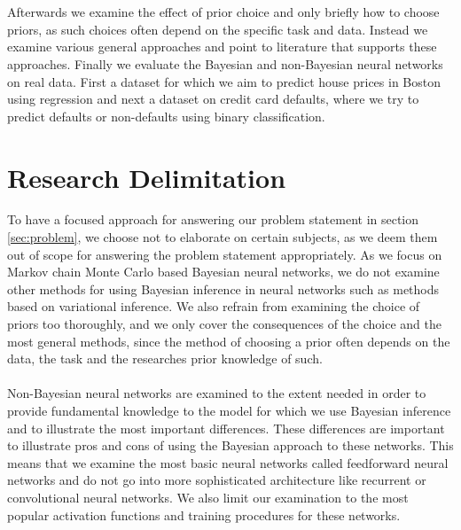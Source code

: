 \\
\\
Afterwards we examine the effect of prior choice and only briefly how to choose priors, as such choices often depend on the specific task and data. Instead we examine various general approaches and point to literature that supports these approaches. Finally we evaluate the Bayesian and non-Bayesian neural networks on real data. First a dataset for which we aim to predict house prices in Boston using regression and next a dataset on credit card defaults, where we try to predict defaults or non-defaults using binary classification. 


\section{Research Delimitation}
To have a focused approach for answering our problem statement in section \ref{sec:problem}, we choose not to elaborate on certain subjects, as we deem them out of scope for answering the problem statement appropriately. As we focus on Markov chain Monte Carlo based Bayesian neural networks, we do not examine other methods for using Bayesian inference in neural networks such as methods based on variational inference. We also refrain from examining the choice of priors too thoroughly, and we only cover the consequences of the choice and the most general methods, since the method of choosing a prior often depends on the data, the task and the researches prior knowledge of such. 
\\
\\
Non-Bayesian neural networks are examined to the extent needed in order to provide fundamental knowledge to the model for which we use Bayesian inference and to illustrate the most important differences. These differences are important to illustrate pros and cons of using the Bayesian approach to these networks. This means that we examine the most basic neural networks called feedforward neural networks and do not go into more sophisticated architecture like recurrent or convolutional neural networks. We also limit our examination to the most popular activation functions and training procedures for these networks. 
\\
\\








